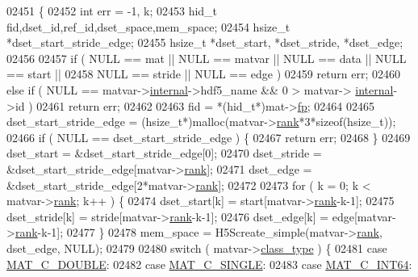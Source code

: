 \begin{DoxyCode}
{{{{{{{{{{02451 \{
02452     \textcolor{keywordtype}{int} err = -1, k;
02453     hid\_t fid,dset\_id,ref\_id,dset\_space,mem\_space;
02454     hsize\_t *dset\_start\_stride\_edge;
02455     hsize\_t *dset\_start, *dset\_stride, *dset\_edge;
02456 
02457     \textcolor{keywordflow}{if} ( NULL == mat || NULL == matvar || NULL == data || NULL == start ||
02458          NULL == stride || NULL == edge )
02459         \textcolor{keywordflow}{return} err;
02460     \textcolor{keywordflow}{else} \textcolor{keywordflow}{if} ( NULL == matvar->\hyperlink{group___m_a_t_a6e97e3ed9f40c49322c18561c2a94e92}{internal}->hdf5\_name && 0 > matvar->
      \hyperlink{group___m_a_t_a6e97e3ed9f40c49322c18561c2a94e92}{internal}->id )
02461         \textcolor{keywordflow}{return} err;
02462 
02463     fid = *(hid\_t*)mat->\hyperlink{struct__mat__t_a85f562e407ca9ad4d2a6e14f839432b7}{fp};
02464 
02465     dset\_start\_stride\_edge = (hsize\_t*)malloc(matvar->\hyperlink{group___m_a_t_a84ba70c96ded13cc555fa75b768d9921}{rank}*3*\textcolor{keyword}{sizeof}(hsize\_t));
02466     \textcolor{keywordflow}{if} ( NULL == dset\_start\_stride\_edge ) \{
02467         \textcolor{keywordflow}{return} err;
02468     \}
02469     dset\_start  = &dset\_start\_stride\_edge[0];
02470     dset\_stride = &dset\_start\_stride\_edge[matvar->\hyperlink{group___m_a_t_a84ba70c96ded13cc555fa75b768d9921}{rank}];
02471     dset\_edge   = &dset\_start\_stride\_edge[2*matvar->\hyperlink{group___m_a_t_a84ba70c96ded13cc555fa75b768d9921}{rank}];
02472 
02473     \textcolor{keywordflow}{for} ( k = 0; k < matvar->\hyperlink{group___m_a_t_a84ba70c96ded13cc555fa75b768d9921}{rank}; k++ ) \{
02474         dset\_start[k]  = start[matvar->\hyperlink{group___m_a_t_a84ba70c96ded13cc555fa75b768d9921}{rank}-k-1];
02475         dset\_stride[k] = stride[matvar->\hyperlink{group___m_a_t_a84ba70c96ded13cc555fa75b768d9921}{rank}-k-1];
02476         dset\_edge[k]   = edge[matvar->\hyperlink{group___m_a_t_a84ba70c96ded13cc555fa75b768d9921}{rank}-k-1];
02477     \}
02478     mem\_space = H5Screate\_simple(matvar->\hyperlink{group___m_a_t_a84ba70c96ded13cc555fa75b768d9921}{rank}, dset\_edge, NULL);
02479 
02480     \textcolor{keywordflow}{switch} ( matvar->\hyperlink{group___m_a_t_aff13035bf3265dd7d9425e5d40c839d4}{class\_type} ) \{
02481         \textcolor{keywordflow}{case} \hyperlink{group___m_a_t_ggad4d60ae7b709fc81bfd744fb4c857c40a5d70e0862e5bdb7bd86bf7ba5948f307}{MAT\_C\_DOUBLE}:
02482         \textcolor{keywordflow}{case} \hyperlink{group___m_a_t_ggad4d60ae7b709fc81bfd744fb4c857c40a2825631e26a961cbe0f79db50a39cea2}{MAT\_C\_SINGLE}:
02483         \textcolor{keywordflow}{case} \hyperlink{group___m_a_t_ggad4d60ae7b709fc81bfd744fb4c857c40a1ea83bcde49b35477494412973f82409}{MAT\_C\_INT64}:
}}}}}}}}}}
\end{DoxyCode}
